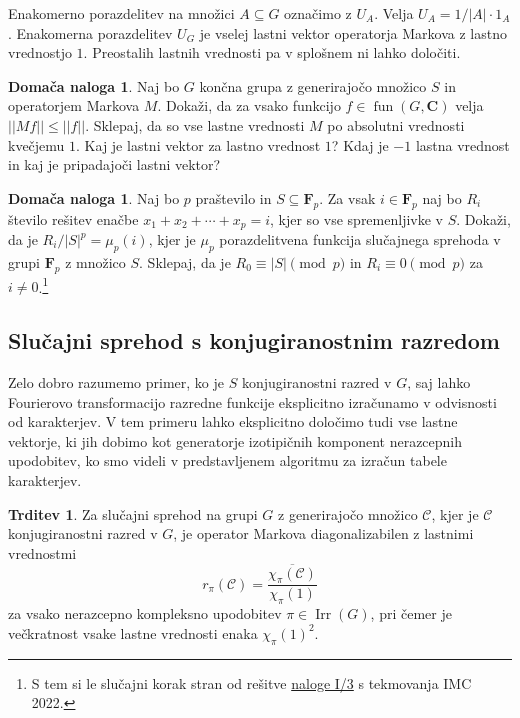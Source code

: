 \documentclass[11pt]{book}
\def\CC{\mathbf{C}}
\def\conclass{\mathcal{C}}
\def\FF{\mathbf{F}}
\DeclareMathOperator\Irr{Irr}
\DeclareMathOperator\fun{fun}
\theoremstyle{definition}
\theoremstyle{zgled}
\theoremstyle{zgledbrezstevilke}
\theoremstyle{odprtproblem}
\theoremstyle{domacanaloga}
\newtheorem{domacanaloga}[theorem]{Domača naloga}
\theoremstyle{izrek}
\newtheorem{trditev}[theorem]{Trditev}
\begin{document}
Enakomerno porazdelitev na množici $A \subseteq G$ označimo z $U_A$. Velja $U_A = 1/|A| \cdot 1_A$. Enakomerna porazdelitev $U_G$ je vselej lastni vektor operatorja Markova z lastno vrednostjo $1$. Preostalih lastnih vrednosti pa v splošnem ni lahko določiti.

\begin{domacanaloga}
Naj bo $G$ končna grupa z generirajočo množico $S$ in operatorjem Markova $M$. Dokaži, da za vsako funkcijo $f \in \fun(G,\CC)$ velja $||Mf|| \leq ||f||$. Sklepaj, da so vse lastne vrednosti $M$ po absolutni vrednosti kvečjemu $1$. Kaj je lastni vektor za lastno vrednost $1$? Kdaj je $-1$ lastna vrednost in kaj je pripadajoči lastni vektor?
\end{domacanaloga}

\begin{domacanaloga}
Naj bo $p$ praštevilo in $S \subseteq \FF_p$. Za vsak $i \in \FF_p$ naj bo $R_i$ število rešitev enačbe $x_1 + x_2 + \cdots + x_p = i$, kjer so vse spremenljivke v $S$. Dokaži, da je $R_i / |S|^p = \mu_p(i)$, kjer je $\mu_p$ porazdelitvena funkcija slučajnega sprehoda v grupi $\FF_p$ z množico $S$. Sklepaj, da je $R_0 \equiv |S| \pmod{p}$ in $R_i \equiv 0 \pmod{p}$ za $i \neq 0$.\footnote{S tem si le slučajni korak stran od rešitve \href{https://www.imc-math.org.uk/imc2022/imc2022day1questions.pdf}{naloge I/3} s tekmovanja IMC 2022.}
\end{domacanaloga}    

\subsection{Slučajni sprehod s konjugiranostnim razredom}

Zelo dobro razumemo primer, ko je $S$ konjugiranostni razred v $G$, saj lahko Fourierovo transformacijo razredne funkcije eksplicitno izračunamo v odvisnosti od karakterjev. V tem primeru lahko eksplicitno določimo tudi vse lastne vektorje, ki jih dobimo kot generatorje izotipičnih komponent nerazcepnih upodobitev, ko smo videli v predstavljenem algoritmu za izračun tabele karakterjev.

\begin{trditev}
Za slučajni sprehod na grupi $G$ z generirajočo množico $\conclass$, kjer je $\conclass$ konjugiranostni razred v $G$, je operator Markova diagonalizabilen z lastnimi vrednostmi
\[
    r_{\pi}(\conclass) = \frac{\overline{\chi_{\pi}(\conclass)}}{\chi_{\pi}(1)}
\]
za vsako nerazcepno kompleksno upodobitev $\pi \in \Irr(G)$, pri čemer je večkratnost vsake lastne vrednosti enaka $\chi_{\pi}(1)^2$.
\end{trditev}
\end{document}
